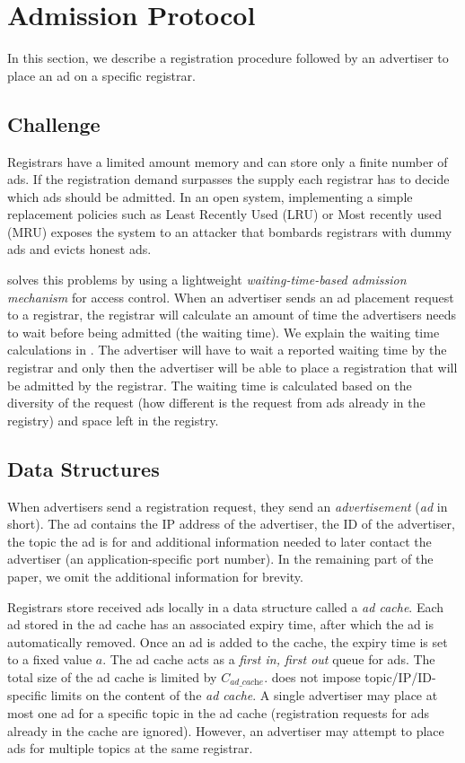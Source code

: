 \section{Admission Protocol}\label{sec:admission}
In this section, we describe a registration procedure followed by an advertiser to place an ad on a specific registrar.

\subsection{Challenge}
Registrars have a limited amount memory and can store only a finite number of ads. If the registration demand surpasses the supply each registrar has to decide which ads should be admitted. In an open system, implementing a simple replacement policies such as Least Recently Used (LRU) or Most recently used (MRU) exposes the system to an attacker that bombards registrars with dummy ads and evicts honest ads.

\sysname solves this problems by using a lightweight \textit{waiting-time-based admission mechanism} for access control. When an advertiser sends an ad placement request to a registrar, the registrar will calculate an amount of time the advertisers needs to wait before being admitted (\ie the waiting time). We explain the waiting time calculations in . The advertiser will have to wait a reported waiting time by the registrar and only then the advertiser will be able to place a registration that will be admitted by the registrar. The waiting time is calculated based on the diversity of the request (\ie how different is the request from ads already in the registry) and space left in the registry. 

\subsection{Data Structures}
When advertisers send a registration request, they send an \emph{advertisement} (\emph{ad} in short). The ad contains the IP address of the advertiser, the ID of the advertiser, the topic the ad is for and additional information needed to later contact the advertiser (\eg an application-specific port number). In the remaining part of the paper, we omit the additional information for brevity. 

Registrars store received ads locally in a data structure called a \emph{ad cache}. Each ad stored in the ad cache has an associated expiry time, after which the ad is automatically removed. Once an ad is added to the cache, the expiry time is set to a fixed value $a$. The ad cache acts as a \emph{first in, first out} queue for ads. The total size of the ad cache is limited by $C_\textit{ad\_cache}$. \sysname does not impose topic/IP/ID-specific limits on the content of the \emph{ad cache}. 
A single advertiser may place at most one ad for a specific topic in the ad cache (registration requests for ads already in the cache are ignored).
However, an advertiser may attempt to place ads for multiple topics at the same registrar.

